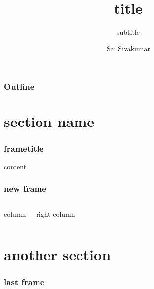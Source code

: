 \documentclass[mathserif]{beamer}
\title[title] %
{title}
\subtitle{subtitle}
\author[Sai Sivakumar] %
{Sai Sivakumar}
\begin{document}
\frame{\titlepage}

\begin{frame}
\frametitle{Outline}
\tableofcontents
\end{frame}

\section{section name}

\begin{frame}
  \frametitle{frametitle}
  content
\end{frame}

\begin{frame}
  \frametitle{new frame}

  \begin{columns}

    column
    
    right column
  \end{columns}
\end{frame}

\section{another section}

\begin{frame}
  \frametitle{last frame}
\end{frame}

\end{document}

